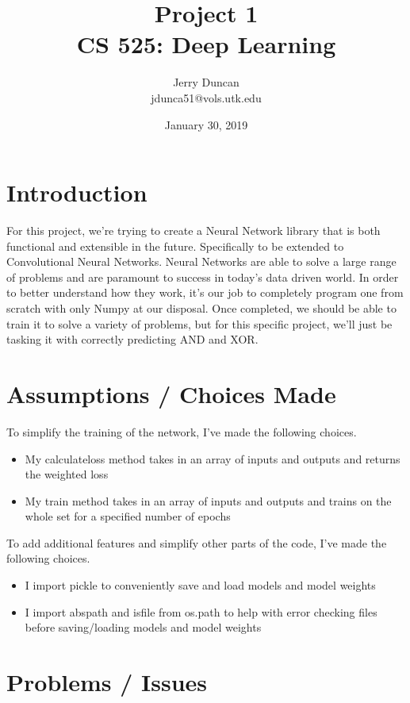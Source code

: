 \documentclass[12pt]{article}
\title{Project 1 \\\vspace{1em}
\large CS 525: Deep Learning}
\author{
  Jerry Duncan \\
  jdunca51@vols.utk.edu
}
\date{January 30, 2019}
\begin{document}
\maketitle
\pagebreak

\section{Introduction}

For this project, we're trying to create a Neural Network library that is both functional and extensible in the future.
Specifically to be extended to Convolutional Neural Networks.
Neural Networks are able to solve a large range of problems and are paramount to success in today's data driven world.
In order to better understand how they work, it's our job to completely program one from scratch with only Numpy at our disposal.
Once completed, we should be able to train it to solve a variety of problems, but for this specific project, we'll just be tasking it with correctly predicting AND and XOR.

\section{Assumptions / Choices Made}

To simplify the training of the network, I've made the following choices.
\begin{itemize}
  \item My calculateloss method takes in an array of inputs and outputs and returns the weighted loss
  \item My train method takes in an array of inputs and outputs and trains on the whole set for a specified number of epochs
\end{itemize}

To add additional features and simplify other parts of the code, I've made the following choices.
\begin{itemize}
  \item I import pickle to conveniently save and load models and model weights
  \item I import abspath and isfile from os.path to help with error checking files before saving/loading models and model weights
\end{itemize}

\section{Problems / Issues}
\end{document}
